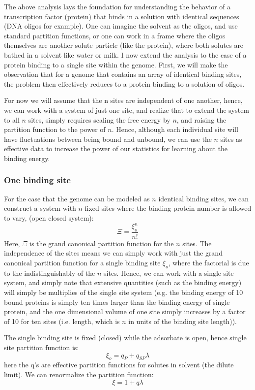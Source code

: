
The above analysis lays the foundation for understanding the behavior of a transcription factor (protein) that binds in a solution with identical sequences (DNA oligos for example).  One can imagine the solvent as the oligos, and use standard partition functions, or one can work in a frame where the oligos themselves are another solute particle (like the protein), where both solutes are bathed in a solvent like water or milk.  I now extend the analysis to the case of a protein binding to a single site within the genome.  First, we will make the observation that for a genome that contains an array of identical binding sites, the problem then effectively reduces to a protein binding to a solution of oligos.

For now we will assume that the n sites are independent of one another, hence, we can work with a system of just one site, and realize that to extend the system to all $n$ sites, simply requires scaling the free energy by $n$, and raising the partition function to the power of $n$.  Hence, although each individual site will have fluctuations between being bound and unbound, we can use the $n$ sites as effective data to increase the power of our statistics for learning about the binding energy.
\subsubsection{One binding site}
For the case that the genome can be modeled as $n$ identical binding sites, we can construct a system with $n$ fixed sites where the binding protein number is allowed to vary, (open closed system):
\begin{equation}\label{}
  \Xi = \frac{\xi_o^n}{n!}
\end{equation}
 Here, $\Xi$ is the grand canonical partition function for the $n$ sites.  The independence of the sites means we can simply work with just the grand canonical partition function for a single binding site $\xi_o$, where the factorial is due to the indistinguishably of the $n$ sites.  Hence, we can work with a single site system, and simply note that extensive quantities (such as the binding energy) will simply be multiplies of the single site system (e.g. the binding energy of 10 bound proteins is simply ten times larger than the binding energy of single protein, and the one dimensional volume of one site simply increases by a factor of 10 for ten sites (i.e. length, which is $n$ in units of the binding site length)).


The single binding site is fixed (closed) while the adsorbate is open, hence single site partition function is:
\begin{equation}\label{}
  \xi_o = q_P + q_{SP} \lambda
\end{equation}
here the q's are effective partition functions for solutes in solvent (the dilute limit).  We can renormalize the partition function:
\begin{equation}\label{}
  \xi = 1 + q \lambda
\end{equation}

